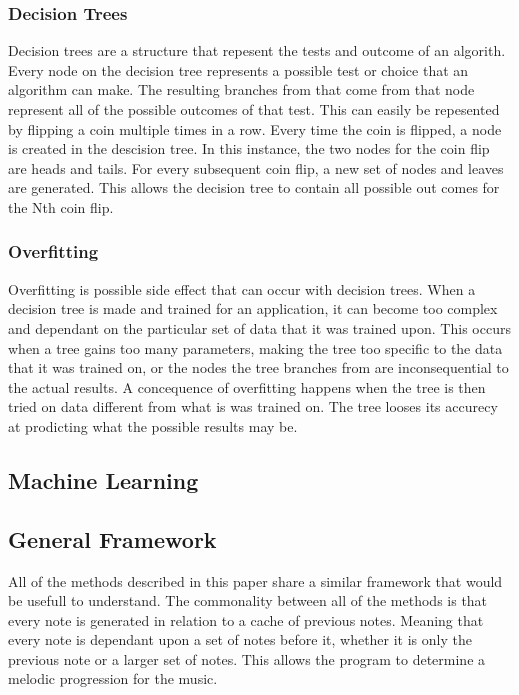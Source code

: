 \documentclass{sig-alternate}
\begin{document}
\subsubsection{Decision Trees}
\label{sec:decision_trees}
	Decision trees are a structure that repesent the tests and outcome of an algorith. Every node on the decision tree represents a possible test or choice that an algorithm can make. The resulting branches from that come from that node represent all of the possible outcomes of that test. This can easily be repesented by flipping a coin multiple times in a row. Every time the coin is flipped, a node is created in the descision tree. In this instance, the two nodes for the coin flip are heads and tails. For every subsequent coin flip, a new set of nodes and leaves are generated. This allows the decision tree to contain all possible out comes for the Nth coin flip. 

\subsubsection{Overfitting}
\label{sec:overfitting}
	Overfitting is possible side effect that can occur with decision trees. When a decision tree is made and trained for an application, it can become too complex and dependant on the particular set of data that it was trained upon. This occurs when a tree gains too many parameters, making the tree too specific to the data that it was trained on, or the nodes the tree branches from are inconsequential to the actual results. A concequence of overfitting  happens when the tree is then tried on data different from what is was trained on. The tree looses its accurecy at prodicting what the possible results may be. 

\subsection{Machine Learning}
\label{sec:machinelearning}

\subsection{General Framework}
\label{sec:framework}
	All of the methods described in this paper share a similar framework that would be usefull to understand. The commonality between all of the methods is that every note is generated in relation to a cache of previous notes. Meaning that every note is dependant upon a set of notes before it, whether it is only the previous note or a larger set of notes. This allows the program to determine a melodic progression for the music. 
\end{document}
